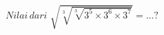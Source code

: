 \documentclass[preview]{standalone}
\begin{document}
\begin{align*}
Nilai \, dari\,\, \sqrt{\sqrt[3]{\sqrt[3]{3^5 \times 3^6 \times 3^7}}} =\dots?
\end{align*}
\end{document}
